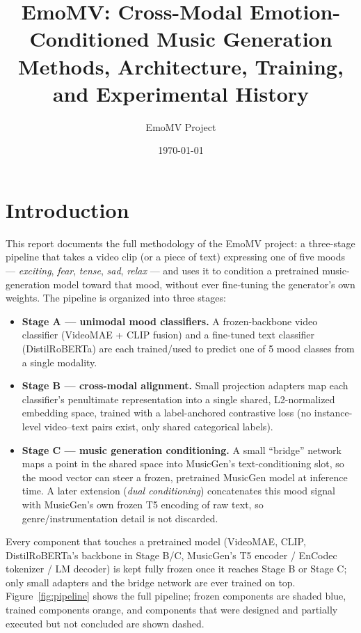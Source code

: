 \documentclass[11pt]{article}
\title{\textbf{EmoMV: Cross-Modal Emotion-Conditioned Music Generation}\\
\large Methods, Architecture, Training, and Experimental History}
\author{EmoMV Project}
\date{\today}
\begin{document}
\maketitle
\tableofcontents

\section{Introduction}

This report documents the full methodology of the EmoMV project: a three-stage pipeline that
takes a video clip (or a piece of text) expressing one of five moods --- \emph{exciting},
\emph{fear}, \emph{tense}, \emph{sad}, \emph{relax} --- and uses it to condition a pretrained
music-generation model toward that mood, without ever fine-tuning the generator's own weights.
The pipeline is organized into three stages:

\begin{itemize}
  \item \textbf{Stage A --- unimodal mood classifiers.} A frozen-backbone video classifier
  (VideoMAE + CLIP fusion) and a fine-tuned text classifier (DistilRoBERTa) are each trained/used
  to predict one of 5 mood classes from a single modality.
  \item \textbf{Stage B --- cross-modal alignment.} Small projection adapters map each
  classifier's penultimate representation into a single shared, L2-normalized embedding space,
  trained with a label-anchored contrastive loss (no instance-level video--text pairs exist, only
  shared categorical labels).
  \item \textbf{Stage C --- music generation conditioning.} A small ``bridge'' network maps a
  point in the shared space into MusicGen's text-conditioning slot, so the mood vector can steer a
  frozen, pretrained MusicGen model at inference time. A later extension (\emph{dual
  conditioning}) concatenates this mood signal with MusicGen's own frozen T5 encoding of raw text,
  so genre/instrumentation detail is not discarded.
\end{itemize}

Every component that touches a pretrained model (VideoMAE, CLIP, DistilRoBERTa's backbone in
Stage B/C, MusicGen's T5 encoder / EnCodec tokenizer / LM decoder) is kept fully frozen once it
reaches Stage B or Stage C; only small adapters and the bridge network are ever trained on top.
Figure~\ref{fig:pipeline} shows the full pipeline; frozen components are shaded blue, trained
components orange, and components that were designed and partially executed but not concluded are
shown dashed.
\end{document}
